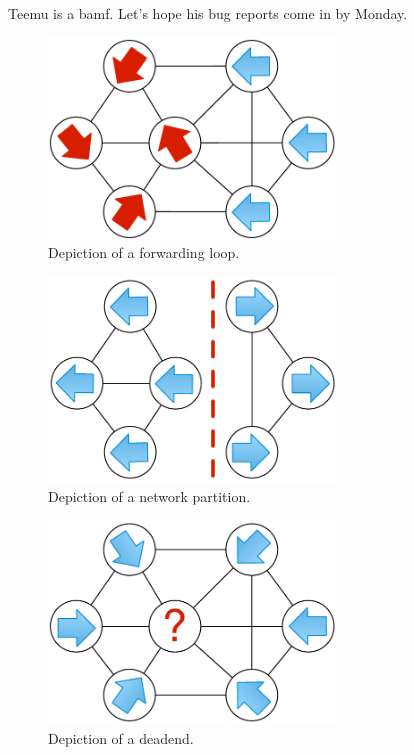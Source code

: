 
Teemu is a bamf. Let's hope his bug reports come in by Monday.

\begin{figure}[t]
    \centering
    \includegraphics[width=3in]{../diagrams/bugs/loop.pdf}
    \caption[]{\label{fig:loop} Depiction of a forwarding loop.\vspace{-10pt}} 
\end{figure}


\begin{figure}[t]
    \centering
    \includegraphics[width=3in]{../diagrams/bugs/partition.pdf}
    \caption[]{\label{fig:partition} Depiction of a network partition.\vspace{-10pt}}
\end{figure}

\begin{figure}[t]
    \centering
    \includegraphics[width=3in]{../diagrams/bugs/dead_end.pdf}
    \caption[]{\label{fig:blackhole} Depiction of a deadend.\vspace{-10pt}} 
\end{figure}


